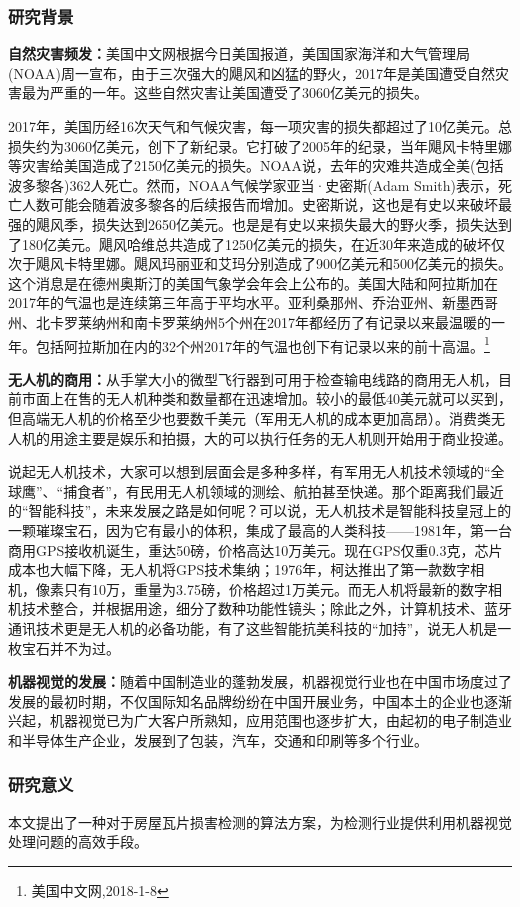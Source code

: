 \subsubsection{研究背景}
\textbf{自然灾害频发：}美国中文网根据今日美国报道，美国国家海洋和大气管理局(NOAA)周一宣布，由于三次强大的飓风和凶猛的野火，2017年是美国遭受自然灾害最为严重的一年。这些自然灾害让美国遭受了3060亿美元的损失。

2017年，美国历经16次天气和气候灾害，每一项灾害的损失都超过了10亿美元。总损失约为3060亿美元，创下了新纪录。它打破了2005年的纪录，当年飓风卡特里娜等灾害给美国造成了2150亿美元的损失。NOAA说，去年的灾难共造成全美(包括波多黎各)362人死亡。然而，NOAA气候学家亚当·史密斯(Adam Smith)表示，死亡人数可能会随着波多黎各的后续报告而增加。史密斯说，这也是有史以来破坏最强的飓风季，损失达到2650亿美元。也是是有史以来损失最大的野火季，损失达到了180亿美元。飓风哈维总共造成了1250亿美元的损失，在近30年来造成的破坏仅次于飓风卡特里娜。飓风玛丽亚和艾玛分别造成了900亿美元和500亿美元的损失。这个消息是在德州奥斯汀的美国气象学会年会上公布的。美国大陆和阿拉斯加在2017年的气温也是连续第三年高于平均水平。亚利桑那州、乔治亚州、新墨西哥州、北卡罗莱纳州和南卡罗莱纳州5个州在2017年都经历了有记录以来最温暖的一年。包括阿拉斯加在内的32个州2017年的气温也创下有记录以来的前十高温。\footnote{美国中文网,2018-1-8}

\textbf{无人机的商用：}从手掌大小的微型飞行器到可用于检查输电线路的商用无人机，目前市面上在售的无人机种类和数量都在迅速增加。较小的最低40美元就可以买到，但高端无人机的价格至少也要数千美元（军用无人机的成本更加高昂）。消费类无人机的用途主要是娱乐和拍摄，大的可以执行任务的无人机则开始用于商业投递。

说起无人机技术，大家可以想到层面会是多种多样，有军用无人机技术领域的“全球鹰”、“捕食者”，有民用无人机领域的测绘、航拍甚至快递。那个距离我们最近的“智能科技”，未来发展之路是如何呢？可以说，无人机技术是智能科技皇冠上的一颗璀璨宝石，因为它有最小的体积，集成了最高的人类科技——1981年，第一台商用GPS接收机诞生，重达50磅，价格高达10万美元。现在GPS仅重0.3克，芯片成本也大幅下降，无人机将GPS技术集纳；1976年，柯达推出了第一款数字相机，像素只有10万，重量为3.75磅，价格超过1万美元。而无人机将最新的数字相机技术整合，并根据用途，细分了数种功能性镜头；除此之外，计算机技术、蓝牙通讯技术更是无人机的必备功能，有了这些智能抗美科技的“加持”，说无人机是一枚宝石并不为过。

\textbf{机器视觉的发展：}随着中国制造业的蓬勃发展，机器视觉行业也在中国市场度过了发展的最初时期，不仅国际知名品牌纷纷在中国开展业务，中国本土的企业也逐渐兴起，机器视觉已为广大客户所熟知，应用范围也逐步扩大，由起初的电子制造业和半导体生产企业，发展到了包装，汽车，交通和印刷等多个行业。

\subsubsection{研究意义}
本文提出了一种对于房屋瓦片损害检测的算法方案，为检测行业提供利用机器视觉处理问题的高效手段。